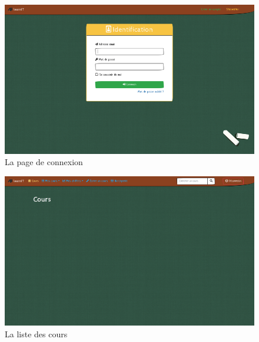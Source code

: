 \begin{figure}[!h]
    \centering
    \includegraphics[scale=1]{textures/images/annexes/site/1c-Sidentifier.png}
    \caption{La page de connexion}
\end{figure}
\begin{figure}[!h]
    \centering
    \includegraphics[scale=1]{textures/images/annexes/site/2-Cours.png}
    \caption{La liste des cours}
\end{figure}

\newpage

